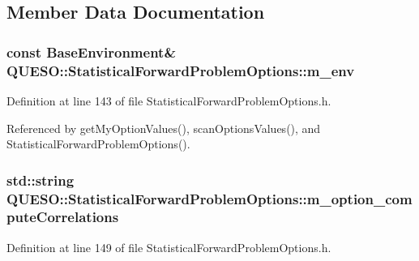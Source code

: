 \subsection{Member Data Documentation}
\hypertarget{class_q_u_e_s_o_1_1_statistical_forward_problem_options_a14f437399d668fac2aac5861bd6f39ca}{
\subsubsection[{m\-\_\-env}]{\setlength{\rightskip}{0pt plus 5cm}const {\bf Base\-Environment}\& Q\-U\-E\-S\-O\-::\-Statistical\-Forward\-Problem\-Options\-::m\-\_\-env\hspace{0.3cm}{\ttfamily [private]}}}\label{class_q_u_e_s_o_1_1_statistical_forward_problem_options_a14f437399d668fac2aac5861bd6f39ca}


Definition at line 143 of file Statistical\-Forward\-Problem\-Options.\-h.



Referenced by get\-My\-Option\-Values(), scan\-Options\-Values(), and Statistical\-Forward\-Problem\-Options().

\hypertarget{class_q_u_e_s_o_1_1_statistical_forward_problem_options_ad712823b5b7b3ce5c76a793a531f0f80}{
\subsubsection[{m\-\_\-option\-\_\-compute\-Correlations}]{\setlength{\rightskip}{0pt plus 5cm}std\-::string Q\-U\-E\-S\-O\-::\-Statistical\-Forward\-Problem\-Options\-::m\-\_\-option\-\_\-compute\-Correlations\hspace{0.3cm}{\ttfamily [private]}}}\label{class_q_u_e_s_o_1_1_statistical_forward_problem_options_ad712823b5b7b3ce5c76a793a531f0f80}


Definition at line 149 of file Statistical\-Forward\-Problem\-Options.\-h.



